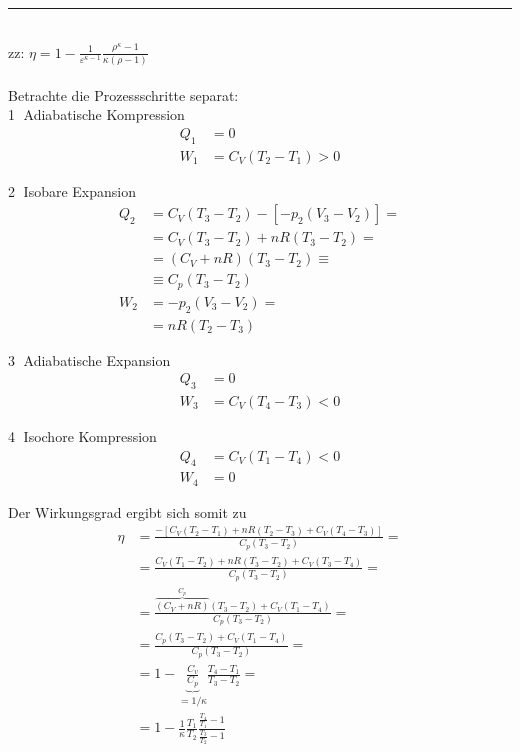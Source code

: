\documentclass{article}
\newcommand{\lreck}[1]{\left[#1\right]}
\begin{document}
{\color{violet}
\hrule
	\\
	zz: $\eta = 1 - \frac{1}{ \varepsilon^{\kappa-1} } \frac{ \rho^\kappa - 1 }{ \kappa( \rho - 1) }$\\
	\\
	Betrachte die Prozessschritte separat:\\
	\textcircled{1} Adiabatische Kompression
		\begin{align*}
			Q_1 &= 0 \\
			W_1 &= C_V (T_2 - T_1) > 0
		\end{align*}
	
	\textcircled{2} Isobare Expansion
		\begin{align*}
			Q_2 &= C_V(T_3 - T_2) - \lreck{ -p_2(V_3 - V_2) } = \\
			&= C_V (T_3 - T_2) + nR (T_3 - T_2) = \\
			&= (C_V + nR)(T_3 - T_2) \equiv \\
			&\equiv C_p (T_3 - T_2) \\
			W_2 &= -p_2 (V_3 - V_2) = \\
			&= n R (T_2 - T_3)
		\end{align*}
	
	\textcircled{3} Adiabatische Expansion
		\begin{align*}
			Q_3 &= 0 \\
			W_3 &= C_V (T_4 - T_3) < 0
		\end{align*}
	
	\textcircled{4} Isochore Kompression
		\begin{align*}
			Q_4 &= C_V(T_1 - T_4) < 0 \\
			W_4 &= 0
		\end{align*}

	Der Wirkungsgrad ergibt sich somit zu
		\begin{align*}
			\eta &= \frac{ -\lreck{ C_V(T_2 - T_1) + n R(T_2 - T_3) + C_V(T_4 - T_3) } }{ C_p (T_3 - T_2) } = \\
			&= \frac{ C_V(T_1 - T_2) + n R(T_3 - T_2) + C_V(T_3 - T_4) }{ C_p (T_3 - T_2) } = \\
			&= \frac{ \overbrace{ (C_V + nR) }^{C_p} (T_3 - T_2) + C_V(T_1 - T_4) }{ C_p(T_3 - T_2) } = \\
			&= \frac{ C_p (T_3 - T_2) + C_V(T_1 - T_4) }{ C_p(T_3 - T_2) } = \\
			&= 1 - \underbrace{ \frac{C_v}{C_p} }_{=1/\kappa} \frac{T_4 - T_1}{T_3 - T_2} = \\
			&= 1 - \frac{1}{\kappa} \frac{T_1}{T_2} \frac{\frac{T_4}{T_1} - 1}{\frac{T_3}{T_2} - 1}
		\end{align*}

}
\end{document}
